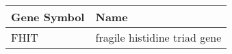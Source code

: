 \begin{tabular}{ll}
\toprule
Gene Symbol &                         Name \\
\midrule
       FHIT & fragile histidine triad gene \\
\bottomrule
\end{tabular}

